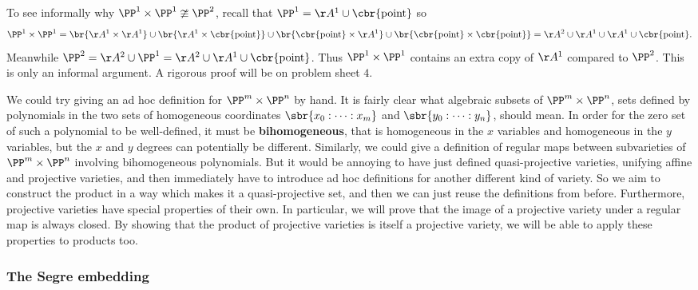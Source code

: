 \begin{example*}
To see informally why $ \PP^1 \times \PP^1 \ncong \PP^2 $, recall that $ \PP^1 = \AA^1 \cup \cbr{\text{point}} $ so
$$ \PP^1 \times \PP^1 = \br{\AA^1 \times \AA^1} \cup \br{\AA^1 \times \cbr{\text{point}}} \cup \br{\cbr{\text{point}} \times \AA^1} \cup \br{\cbr{\text{point}} \times \cbr{\text{point}}} = \AA^2 \cup \AA^1 \cup \AA^1 \cup \cbr{\text{point}}. $$
Meanwhile $ \PP^2 = \AA^2 \cup \PP^1 = \AA^2 \cup \AA^1 \cup \cbr{\text{point}} $. Thus $ \PP^1 \times \PP^1 $ contains an extra copy of $ \AA^1 $ compared to $ \PP^2 $. This is only an informal argument. A rigorous proof will be on problem sheet $ 4 $.
\end{example*}

We could try giving an ad hoc definition for $ \PP^m \times \PP^n $ by hand. It is fairly clear what algebraic subsets of $ \PP^m \times \PP^n $, sets defined by polynomials in the two sets of homogeneous coordinates $ \sbr{x_0 : \dots : x_m} $ and $ \sbr{y_0 : \dots : y_n} $, should mean. In order for the zero set of such a polynomial to be well-defined, it must be \textbf{bihomogeneous}, that is homogeneous in the $ x $ variables and homogeneous in the $ y $ variables, but the $ x $ and $ y $ degrees can potentially be different. Similarly, we could give a definition of regular maps between subvarieties of $ \PP^m \times \PP^n $ involving bihomogeneous polynomials. But it would be annoying to have just defined quasi-projective varieties, unifying affine and projective varieties, and then immediately have to introduce ad hoc definitions for another different kind of variety. So we aim to construct the product in a way which makes it a quasi-projective set, and then we can just reuse the definitions from before. Furthermore, projective varieties have special properties of their own. In particular, we will prove that the image of a projective variety under a regular map is always closed. By showing that the product of projective varieties is itself a projective variety, we will be able to apply these properties to products too.

\pagebreak

\subsubsection{The Segre embedding}


